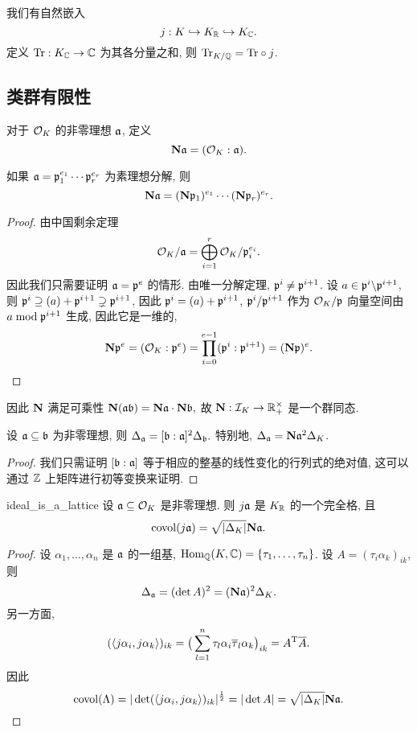 我们有自然嵌入
  \[j:K\inj K_\BR\inj K_\BC.\]
定义 $\Tr:K_\BC\to \BC$ 为其各分量之和, 则 $\Tr_{K/\BQ}=\Tr\circ j$.


\subsection{类群有限性}

对于 $\CO_K$ 的非零理想 $\fa$, 定义
  \[\bfN\fa=(\CO_K:\fa).\]

\begin{theorem}{}{}
如果 $\fa=\fp_1^{e_1}\cdots\fp_r^{e_r}$ 为素理想分解, 则
  \[\bfN\fa=(\bfN\fp_1)^{e_1}\cdots(\bfN\fp_r)^{e_r}.\]
\end{theorem}
\begin{proof}
由中国剩余定理
  \[\CO_K/\fa=\bigoplus_{i=1}^r\CO_K/\fp_i^{e_i}.\]
因此我们只需要证明 $\fa=\fp^e$ 的情形. 由唯一分解定理, $\fp^i\neq \fp^{i+1}$. 设 $a\in\fp^i\bs \fp^{i+1}$, 则 $\fp^i\supseteq (a)+\fp^{i+1}\supsetneq \fp^{i+1}$, 因此 $\fp^i=(a)+\fp^{i+1}$, $\fp^i/\fp^{i+1}$ 作为 $\CO_K/\fp$ 向量空间由 $a\mod \fp^{i+1}$ 生成, 因此它是一维的,
  \[\bfN\fp^e=(\CO_K:\fp^e)=\prod_{i=0}^{e-1} (\fp^i:\fp^{i+1})=(\bfN\fp)^e.\]
\end{proof}

因此 $\bfN$ 满足可乘性 $\bfN(\fa\fb)=\bfN\fa \cdot\bfN\fb,$ 故 $\bfN:\CI_K\to \BR_+^\times$ 是一个群同态.

\begin{proposition}{}{}
设 $\fa\subseteq \fb$ 为非零理想, 则 $\Delta_\fa=[\fb:\fa]^2\Delta_\fb.$
特别地, $\Delta_\fa=\bfN\fa^2 \Delta_K$.
\end{proposition}
\begin{proof}
我们只需证明 $[\fb:\fa]$ 等于相应的整基的线性变化的行列式的绝对值, 这可以通过 $\BZ$ 上矩阵进行初等变换来证明.
\end{proof}

\begin{proposition}{}{ideal_is_a_lattice}
设 $\fa\subseteq \CO_K$ 是非零理想. 则 $j\fa$ 是 $K_\BR$ 的一个完全格, 且
  \[\covol(j\fa)=\sqrt{|\Delta_K|}\bfN\fa.\]
\end{proposition}
\begin{proof}
设 $\alpha_1,\dots,\alpha_n$ 是 $\fa$ 的一组基, $\Hom_\BQ(K,\BC)=\set{\tau_1,\dots,\tau_n}$. 设 $A=(\tau_i \alpha_k)_{ik}$, 则
  \[\Delta_\fa=(\det A)^2=(\bfN\fa)^2 \Delta_K.\]
另一方面, 
  \[(\pair{j\alpha_i,j \alpha_k})_{ik}
=\big(\sum_{l=1}^n \tau_l \alpha_i\ov\tau_l\alpha_k\big)_{ik}=A^\rmT\ov A.\]
因此
  \[\covol(\Lambda)=|\det(\pair{j\alpha_i,j\alpha_k})_{ik}|^\half=|\det A|=\sqrt{|\Delta_K|}\bfN\fa.\]
\end{proof}

